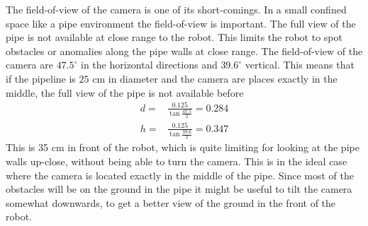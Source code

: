 The field-of-view of the camera is one of its short-comings. In a small confined space
like a pipe environment the field-of-view is important. The full view of the pipe is not 
available at close range to the
robot. This limits the robot to spot obstacles or anomalies along the pipe walls at close
range. The field-of-view of the camera are $47.5^\circ$ in the horizontal directions and
$39.6^\circ$ vertical. This means that if the pipeline is $25$ cm in diameter and the
camera are places exactly in the middle, the full view of the pipe is not available before
\begin{equation}
    \begin{aligned}
        d =& \frac{0.125}{ \tan \frac{47.5}{2}}  = 0.284\\
        h =& \frac{0.125}{\tan \frac{39.6}{2}} = 0.347
    \end{aligned}
\end{equation}
This is 35 cm in front of the robot, which is quite limiting for looking at the pipe walls
up-close, without being able to turn the camera. This is in the ideal case where the
camera is located exactly in
the middle of the pipe. Since most of the obstacles will be on the ground in the pipe it
might be useful to tilt the camera somewhat downwards, to get a better view of the ground
in the front of the robot. 






